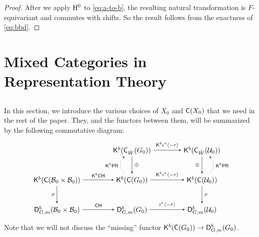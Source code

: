 \documentclass[a4paper,10pt,leqno]{amsart}
\theoremstyle{plain}
\theoremstyle{plain}
\theoremstyle{plain}
\theoremstyle{definition}
\theoremstyle{remark}
\begin{document}
\begin{proof}
After we apply $\ur{H}^0$ to \eqref{eq:a-to-b}, the resulting natural transformation is $F$-equivariant and commutes with shifts.
So the result follows from the exactness of \eqref{eq:bbd}.
\end{proof}



\newpage
\section{Mixed Categories in Representation Theory}\label{sec:hecke}

\subsection{}

In this section, we introduce the various choices of $X_0$ and $\sf{C}(X_0)$ that we need in the rest of the paper.
They, and the functors between them, will be summarized by the following commutative diagram:
\begin{equation}\label{eq:big}
\begin{tikzpicture}[baseline=(current bounding box.center), >=stealth]
\matrix(m)[matrix of math nodes, row sep=2.5em, column sep=4em, text height=2ex, text depth=0.5ex]
{	{}
		&\sf{K}^b(\sf{C}_{\hat{W}}(G_0))
		&\sf{K}^b(\sf{C}_{\hat{W}}(\cal{U}_0))\\
	\sf{K}^b(\sf{C}(\cal{B}_0 \times \cal{B}_0))
		&\sf{K}^b(\sf{C}(G_0))
		&\sf{K}^b(\sf{C}(\cal{U}_0))\\
	\sf{D}_{G, m}^b(\cal{B}_0 \times \cal{B}_0)
		&\sf{D}_{G, m}^b(G_0)
		&\sf{D}_{G, m}^b(\cal{U}_0)\\
		};
\path[->,font=\scriptsize, auto]
(m-1-2) 	edge node{$\sf{K}^b i^\ast \langle -r\rangle$} (m-1-3)
(m-2-2)		edge node{$\sf{K}^b i^\ast \langle -r\rangle$} (m-2-3)
(m-3-2)		edge node{$i^\ast \langle -r\rangle$} (m-3-3)
(m-1-2)		edge node[right]{$\oplus$} (m-2-2)
(m-1-3)		edge node[left]{$\oplus$} (m-2-3)
(m-2-1)		edge node{$\sf{K}^b \sf{CH}$} (m-2-2)
(m-3-1)		edge node{$\sf{CH}$} (m-3-2)
(m-2-3) 	edge node[right]{$\rho$} (m-3-3)	
(m-2-1)		edge node[left]{$\rho$} (m-3-1);
\path[->,font=\scriptsize, auto, densely dotted]
(m-2-2)		edge [bend left=50] node[left]{$\sf{K}^b\sf{PR}$} (m-1-2)
(m-2-3)		edge [bend right=50] node[right]{$\sf{K}^b\sf{PR}$} (m-1-3);
\end{tikzpicture}
\end{equation}
Note that we will not discuss the ``missing'' functor $\sf{K}^b(\sf{C}(G_0)) \to \sf{D}_{G, m}^b(G_0)$.
\end{document}
